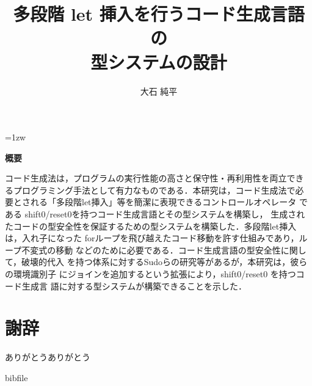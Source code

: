 \documentclass[a4paper,11pt]{jreport}
\title{多段階 let 挿入を行うコード生成言語の\\型システムの設計}
\author{大石 純平}
\theoremstyle{break}
\begin{document}
\maketitle
\thispagestyle{empty}
\newpage

\thispagestyle{empty}
\vspace*{20pt plus 1fil}
\parindent=1zw
\noindent
\begin{center}
  {\bf 概要}
  \vspace{5mm}
\end{center}
コード生成法は，プログラムの実行性能の高さと保守性・再利用性を両立でき
るプログラミング手法として有力なものである．本研究は，コード生成法で必
要とされる「多段階let挿入」等を簡潔に表現できるコントロールオペレータ
である shift0/reset0を持つコード生成言語とその型システムを構築し，
生成されたコードの型安全性を保証するための型システムを構築した．多段階let挿入は，入れ子になった
forループを飛び越えたコード移動を許す仕組みであり，ループ不変式の移動
などのために必要である．コード生成言語の型安全性に関して，破壊的代入
を持つ体系に対するSudoらの研究等があるが，本研究は，彼らの環境識別子
にジョインを追加するという拡張により，shift0/reset0 を持つコード生成言
語に対する型システムが構築できることを示した．

\par
\vspace{0pt plus 1fil}
\newpage

\tableofcontents
\listoffigures

\pagebreak \setcounter{page}{1}









\chapter*{謝辞}
ありがとうありがとう
\newpage

\renewcommand{\bibname}{参考文献}

 {bibfile}
\end{document}
